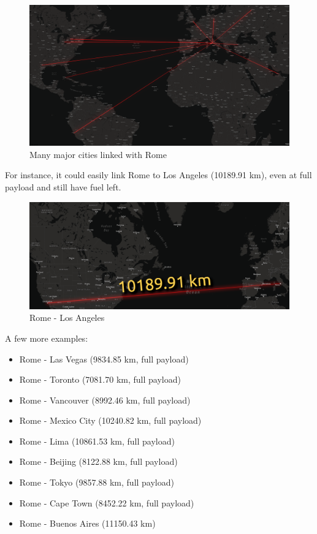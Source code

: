 \documentclass{article}
\begin{document}
\begin{figure}[h!]
    \centering
    \includegraphics[width=\textwidth]{Sources/Plots_and_Pictures/worldwide_routes.png}
    \caption{Many major cities linked with Rome}
    \label{worldwide_maps}
\end{figure}
For instance, it could easily link Rome to Los Angeles (10189.91 km), even at full payload
and still have fuel left.
\begin{figure}[h!]
    \centering
    \includegraphics[width=\textwidth]{Sources/Plots_and_Pictures/rome_LA.png}
    \caption{Rome - Los Angeles}
    \label{rome_LA}
\end{figure}

\clearpage

A few more examples: 

\begin{itemize}
    \item Rome - Las Vegas (9834.85 km, full payload)
    \item Rome - Toronto (7081.70 km, full payload)
    \item Rome - Vancouver (8992.46 km, full payload)
    \item Rome - Mexico City (10240.82 km, full payload)
    \item Rome - Lima (10861.53 km, full payload)
    \item Rome - Beijing (8122.88 km, full payload)
    \item Rome - Tokyo (9857.88 km, full payload)
    \item Rome - Cape Town (8452.22 km, full payload)
    \item Rome - Buenos Aires (11150.43 km)
\end{itemize}
\end{document}
